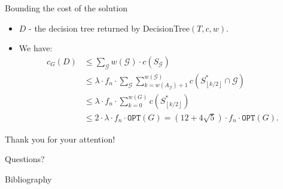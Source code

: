 \documentclass{beamer}
\newcommand{\br}[1]{\mathopen{}\left( #1 \right)}
\newcommand{\fl}[1]{\mathopen{}\left\lfloor #1 \right\rfloor}
\newcommand{\OPT}{\texttt{OPT}}
\begin{document}
\begin{frame}{Bounding the cost of the solution }
\begin{itemize}
    \item $D$ - the decision tree returned by DecisionTree$\br{T,c,w}$.
    \pause 
    \item We have:
    \begin{align*}
            c_G\br{D}&\leq \sum_{\mathcal{G}}w\br{\mathcal{G}}\cdot c\br{S_{\mathcal{G}}}\\
            &\leq \lambda \cdot f_n\cdot \sum_{\mathcal{G}}\sum_{k=w\br{A_{\mathcal{G}}}+1}^{w\br{\mathcal{G}}}c\br{S_{\fl{k/2}}^*\cap \mathcal{G}}
            \\&\leq 
            \lambda \cdot f_n\cdot\sum_{k=0}^{w\br{G}}c\br{S_{\fl{k/2}}^*} \\
            &\leq 2\cdot \lambda \cdot f_n\cdot \OPT\br{G} = \br{12+4\sqrt{5}}\cdot f_n \cdot \OPT\br{G}.
        \end{align*}
\end{itemize} 
\end{frame}


\begin{frame}
\centering
\huge
Thank you for your attention!

Questions?
\end{frame}

\begin{frame}[allowframebreaks]{Bibliography}
\footnotesize
\printbibliography
\end{frame}
\end{document}
